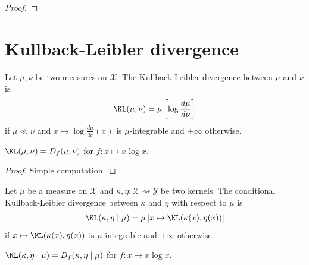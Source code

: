\begin{proof}\leanok
{}
\end{proof}

\section{Kullback-Leibler divergence}

\begin{definition}
  \label{def:KL}
  \mathlibok
  Let $\mu, \nu$ be two measures on $\mathcal X$. The Kullback-Leibler divergence between $\mu$ and $\nu$ is
  \begin{align*}
  \KL(\mu, \nu) = \mu\left[\log \frac{d \mu}{d \nu}\right]
  \end{align*}
  if $\mu \ll \nu$ and $x \mapsto \log \frac{d \mu}{d \nu}(x)$ is $\mu$-integrable and $+\infty$ otherwise.
\end{definition}


\begin{lemma}
  \label{lem:kl_eq_fDiv}
  \leanok
  $\KL(\mu, \nu) = D_f(\mu, \nu)$ for $f: x \mapsto x \log x$.
\end{lemma}

\begin{proof}\leanok
Simple computation.
\end{proof}


\begin{definition}
  \label{def:condKL}
  \leanok
  Let $\mu$ be a measure on $\mathcal X$ and $\kappa, \eta : \mathcal X \rightsquigarrow \mathcal Y$ be two kernels. The conditional Kullback-Leibler divergence between $\kappa$ and $\eta$ with respect to $\mu$ is
  \begin{align*}
  \KL(\kappa, \eta \mid \mu) = \mu\left[x \mapsto \KL(\kappa(x), \eta(x))\right]
  \end{align*}
  if $x \mapsto \KL(\kappa(x), \eta(x))$ is $\mu$-integrable and $+\infty$ otherwise.
\end{definition}


\begin{lemma}
  \label{lem:condKL_eq_condFDiv}
  \leanok
  $\KL(\kappa, \eta \mid \mu) = D_f(\kappa, \eta \mid \mu)$ for $f: x \mapsto x \log x$.
\end{lemma}

